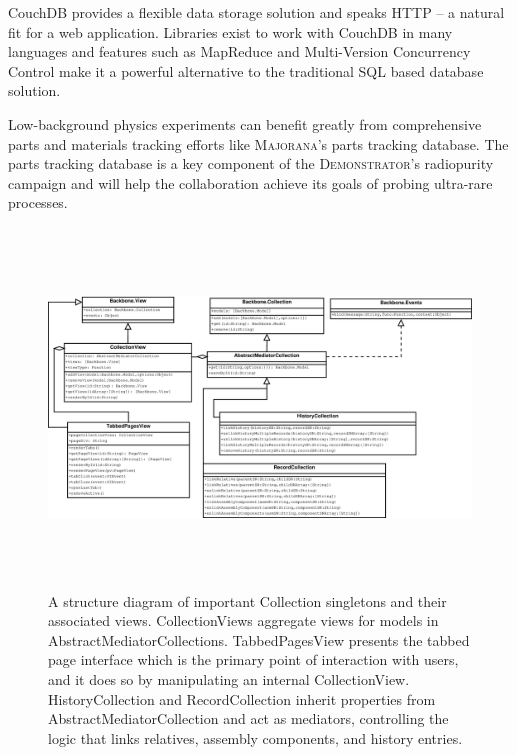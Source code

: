 \documentclass[journal]{IEEEtran}
\begin{document}
CouchDB provides a flexible data storage solution and speaks HTTP -- a natural
fit for a web application. Libraries exist to work with CouchDB in many languages and
features such as MapReduce and Multi-Version Concurrency Control make it a powerful
alternative to the traditional SQL based database solution.

Low-background physics experiments can benefit greatly from comprehensive
parts and materials tracking efforts like \textsc{Majorana}'s parts tracking database.
The parts tracking database is a 
key component of the \textsc{Demonstrator}'s radiopurity campaign and will help the collaboration achieve
its goals of probing ultra-rare processes.

\clearpage

\begin{figure}[!p]
\centering
\includegraphics[height=3.75in]{Singletons}
\caption{A structure diagram of important Collection singletons and their associated views. CollectionViews aggregate views for models in
AbstractMediatorCollections. TabbedPagesView presents the tabbed page interface which is the primary point of interaction with users, and it
does so by manipulating an internal CollectionView. HistoryCollection and RecordCollection inherit properties from AbstractMediatorCollection
and act as mediators, controlling the logic that links relatives, assembly components, and history entries.}
\label{singletons}
\end{figure}
\end{document}
